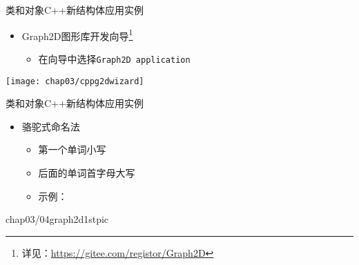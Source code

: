 \begin{frame}{类和对象}{C++新结构体应用实例}%
  \stretchon
  \begin{itemize}  
  \item Graph2D图形库开发向导\footnote[frame]{详见：\url{https://gitee.com/registor/Graph2D}}
      \begin{itemize}
      \item 在向导中选择\texttt{Graph2D application}     
      \end{itemize}
  \end{itemize}
  \centering
    \texttt{[image: chap03/cppg2dwizard]}
  \stretchoff
\end{frame}

\begin{frame}[fragile]{类和对象}{C++新结构体应用实例}%
  \begin{spacing}{1.4}
    \begin{itemize}
    \item {}骆驼式命名法
      \begin{itemize}
      \item 第一个单词小写
      \item 后面的单词首字母大写
      \item 示例：
      \end{itemize}
    \end{itemize}
  \end{spacing}
  \vspace{-2ex}
  \begin{center}
    \hspace{1em}
    \begin{minipage}{0.5\linewidth}
    \end{minipage}\quad
    \begin{minipage}{0.4\linewidth}
      \begin{overpic}[scale=.15,unit=1mm]%
        {chap03/04graph2d1stpic}
      \end{overpic}      
    \end{minipage}    
  \end{center}
\end{frame}

